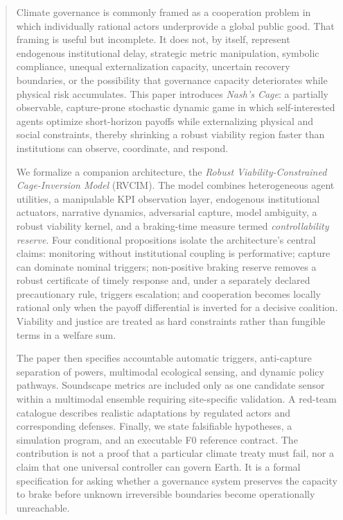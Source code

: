 \documentclass[11pt,a4paper]{article}
\numberwithin{equation}{section}
\theoremstyle{definition}
\theoremstyle{plain}
\theoremstyle{remark}
\newcommand{\RVCIM}{\textsc{RVCIM}}
\begin{document}
\begin{abstract}
Climate governance is commonly framed as a cooperation problem in which individually rational actors underprovide a global public good. That framing is useful but incomplete. It does not, by itself, represent endogenous institutional delay, strategic metric manipulation, symbolic compliance, unequal externalization capacity, uncertain recovery boundaries, or the possibility that governance capacity deteriorates while physical risk accumulates. This paper introduces \emph{Nash's Cage}: a partially observable, capture-prone stochastic dynamic game in which self-interested agents optimize short-horizon payoffs while externalizing physical and social constraints, thereby shrinking a robust viability region faster than institutions can observe, coordinate, and respond.

We formalize a companion architecture, the \emph{Robust Viability-Constrained Cage-Inversion Model} (\RVCIM). The model combines heterogeneous agent utilities, a manipulable KPI observation layer, endogenous institutional actuators, narrative dynamics, adversarial capture, model ambiguity, a robust viability kernel, and a braking-time measure termed \emph{controllability reserve}. Four conditional propositions isolate the architecture's central claims: monitoring without institutional coupling is performative; capture can dominate nominal triggers; non-positive braking reserve removes a robust certificate of timely response and, under a separately declared precautionary rule, triggers escalation; and cooperation becomes locally rational only when the payoff differential is inverted for a decisive coalition. Viability and justice are treated as hard constraints rather than fungible terms in a welfare sum.

The paper then specifies accountable automatic triggers, anti-capture separation of powers, multimodal ecological sensing, and dynamic policy pathways. Soundscape metrics are included only as one candidate sensor within a multimodal ensemble requiring site-specific validation. A red-team catalogue describes realistic adaptations by regulated actors and corresponding defenses. Finally, we state falsifiable hypotheses, a simulation program, and an executable F0 reference contract. The contribution is not a proof that a particular climate treaty must fail, nor a claim that one universal controller can govern Earth. It is a formal specification for asking whether a governance system preserves the capacity to brake before unknown irreversible boundaries become operationally unreachable.
\end{abstract}
\end{document}
